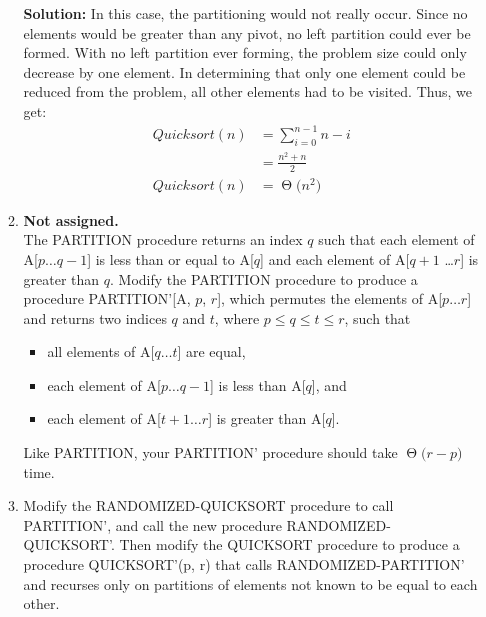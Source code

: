 \documentclass[11pts]{article}
\newcommand{\BigTheta}[1]{\ensuremath{\operatorname{\Theta}\bigl(#1\bigr)}}
\begin{document}
\begin{enumerate}
\begin{enumerate}
  \textbf{Solution:} In this case, the partitioning would not really occur.
  Since no elements would be greater than any pivot, no left partition
  could ever be formed. With no left partition ever forming, the problem size
  could only decrease by one element. In determining that only one
  element could be reduced from the problem, all other elements had to
  be visited. Thus, we get:
  \begin{align*}
    Quicksort(n) &= \sum_{i=0}^{n-1}{n-i} \\
                 &= \frac{n^{2}+n}{2} \\
    Quicksort(n) &= \BigTheta{n^{2}}
  \end{align*}

  \item \textbf{Not assigned.} \\
  The PARTITION procedure returns an index $q$ such that each element of
  A[$p \dots q - 1$] is less than or equal to A[$q$] and each element
  of A[$q + 1$ \dots $r$] is greater than $q$. Modify the
  PARTITION procedure to produce a procedure
  PARTITION'[A, $p$, $r$], which permutes the elements
  of A[$p \dots r$] and returns two
  indices $q$ and $t$, where $p \le q \le t \le r$,
  such that
  \begin{itemize}
    \item all elements of A[$q \dots t$] are equal, \\
    \item each element of A[$p \dots q - 1$] is less than A[$q$], and \\
    \item each element of A[$t + 1 \dots r$] is greater than A[$q$].
  \end{itemize}
  Like PARTITION, your PARTITION' procedure should
  take \BigTheta{r - p} time. \\


  \item Modify the RANDOMIZED-QUICKSORT procedure to call PARTITION', and
        call the new procedure RANDOMIZED-QUICKSORT'. Then modify the
        QUICKSORT procedure to produce a procedure QUICKSORT'(p, r) that
        calls RANDOMIZED-PARTITION' and recurses only on partitions of
        elements not known to be equal to each other. \\


\end{enumerate}
\end{enumerate}
\end{document}
